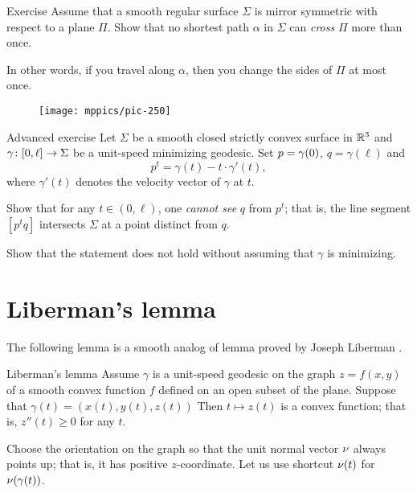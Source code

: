 \begin{thm}{Exercise}\label{ex:min-geod+plane}
Assume that a smooth regular surface $\Sigma$ is mirror symmetric with respect to a plane $\Pi$.
Show that no shortest path $\alpha$ in $\Sigma$ can {}\emph{cross} $\Pi$ more than once.


In other words, if you travel along $\alpha$, then you change the sides of $\Pi$ at most once. 
\end{thm}

{

\begin{wrapfigure}{r}{40 mm}
\vskip-8mm
\centering
\texttt{[image: mppics/pic-250]}
\vskip-0mm
\end{wrapfigure}

\begin{thm}{Advanced exercise}\label{ex:milka}
Let $\Sigma$ be a smooth closed strictly convex surface 
in $\mathbb{R}^3$ 
and $\gamma\:[0,\ell]\z\to \Sigma$ be a unit-speed minimizing geodesic.
Set $p\z=\gamma(0)$, $q=\gamma(\ell)$ and 
$$p^t=\gamma(t)-t\cdot\gamma'(t),$$ 
where $\gamma'(t)$ denotes the velocity vector of $\gamma$ at $t$.

Show that for any $t\in (0,\ell)$,
one {}\emph{cannot see}  $q$ from $p^t$;
that is, the line segment $[p^tq]$ intersects $\Sigma$ at a point distinct from $q$.

Show that the statement does not hold without assuming that $\gamma$ is minimizing.
\end{thm}

}

\section{Liberman's lemma}

The following lemma is a smooth analog of lemma proved by Joseph Liberman \cite{liberman}.

\begin{thm}{Liberman's lemma}\label{lem:liberman}
Assume $\gamma$ is a unit-speed geodesic on the graph $z=f(x,y)$ of a smooth convex function $f$ defined on an open subset of the plane.
Suppose that $\gamma(t)=(x(t),y(t),z(t))$
Then $t\mapsto z(t)$ is a convex function; that is, $z''(t)\ge 0$ for any $t$.
\end{thm}

Choose the orientation on the graph so that the unit normal vector $\nu$ always points up;
that is, it has positive $z$-coordinate.
Let us use shortcut $\nu(t)$ for $\nu(\gamma(t))$.

